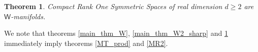 \documentclass[11pt,lettersize,reqno,fullpage]{amsart}
\newtheorem{thm}{Theorem}[section]
\newtheorem{cor}[thm]{Corollary}
\begin{document}
\begin{thm}
\label{CROSS_is_W_ag}
Compact Rank One Symmetric Spaces 
of real dimension $d\geq 2$ 
are $\mathsf{W}$-manifolds.   
\end{thm}
We note that theorems 
\ref{main_thm_W}, \ref{main_thm_W2_sharp} and \ref{CROSS_is_W_ag} 
immediately imply theorems \ref{MT_prod} and \ref{MR2}. 

\end{document}
